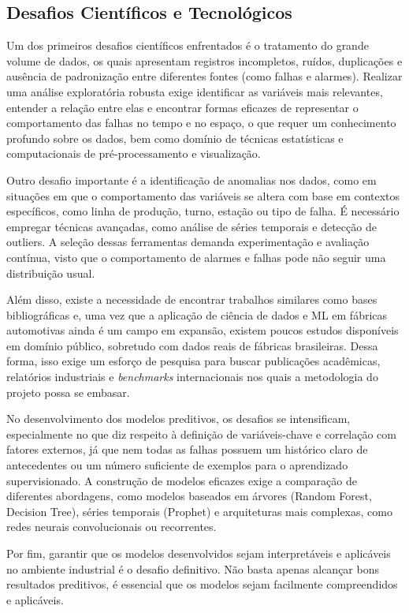 \subsection{Desafios Científicos e Tecnológicos}
\label{sec:apendice-desafios-cientificos}

Um dos primeiros desafios científicos enfrentados é o tratamento do grande volume de dados, os quais apresentam registros incompletos, ruídos, duplicações e ausência de padronização entre diferentes fontes (como falhas e alarmes). Realizar uma análise exploratória robusta exige identificar as variáveis mais relevantes, entender a relação entre elas e encontrar formas eficazes de representar o comportamento das falhas no tempo e no espaço, o que requer um conhecimento profundo sobre os dados, bem como domínio de técnicas estatísticas e computacionais de pré-processamento e visualização.

Outro desafio importante é a identificação de anomalias nos dados, como em situações em que o comportamento das variáveis se altera com base em contextos específicos, como linha de produção, turno, estação ou tipo de falha. É necessário empregar técnicas avançadas, como análise de séries temporais e detecção de outliers. A seleção dessas ferramentas demanda experimentação e avaliação contínua, visto que o comportamento de alarmes e falhas pode não seguir uma distribuição usual.

Além disso, existe a necessidade de encontrar trabalhos similares como bases bibliográficas e, uma vez que a aplicação de ciência de dados e ML em fábricas automotivas ainda é um campo em expansão, existem poucos estudos disponíveis em domínio público, sobretudo com dados reais de fábricas brasileiras. Dessa forma, isso exige um esforço de pesquisa para buscar publicações acadêmicas, relatórios industriais e \textit{benchmarks} internacionais nos quais a metodologia do projeto possa se embasar.

No desenvolvimento dos modelos preditivos, os desafios se intensificam, especialmente no que diz respeito à definição de variáveis-chave e correlação com fatores externos, já que nem todas as falhas possuem um histórico claro de antecedentes ou um número suficiente de exemplos para o aprendizado supervisionado. A construção de modelos eficazes exige a comparação de diferentes abordagens, como modelos baseados em árvores (Random Forest, Decision Tree), séries temporais (Prophet) e arquiteturas mais complexas, como redes neurais convolucionais ou recorrentes.

Por fim, garantir que os modelos desenvolvidos sejam interpretáveis e aplicáveis no ambiente industrial é o desafio definitivo. Não basta apenas alcançar bons resultados preditivos, é essencial que os modelos sejam facilmente compreendidos e aplicáveis.


